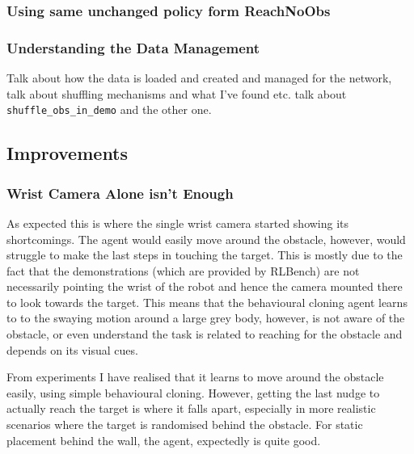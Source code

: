 \subsubsection{Using same unchanged policy form ReachNoObs}

\subsubsection{Understanding the Data Management}
Talk about how the data is loaded and created and managed for the network, talk about shuffling mechanisms and what I've found etc. talk about \verb|shuffle_obs_in_demo| and the other one.

\subsection{Improvements}



\subsubsection{Wrist Camera Alone isn't Enough}
As expected this is where the single wrist camera started showing its shortcomings. The agent would easily move around the obstacle, however, would struggle to make the last steps in touching the target. This is mostly due to the fact that the demonstrations (which are provided by RLBench) are not necessarily pointing the wrist of the robot and hence the camera mounted there to look towards the target. This means that the behavioural cloning agent learns to to the swaying motion around a large grey body, however, is not aware of the obstacle, or even understand the task is related to reaching for the obstacle and depends on its visual cues. 


From experiments I have realised that it learns to move around the obstacle easily, using simple behavioural cloning. However, getting the last nudge to actually reach the target is where it falls apart, especially in more realistic scenarios where the target is randomised behind the obstacle. For static placement behind the wall, the agent, expectedly is quite good. 

